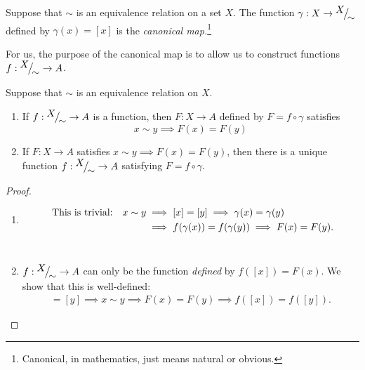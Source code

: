 \begin{defn}{}{}
	Suppose that $\sim$ is an equivalence relation on a set $X$. The function $\gamma:X\to {}^{\textstyle {X}}\!\big/_{\textstyle \!{\sim}}$ defined by $\gamma(x)=[x]$ is the \emph{canonical map.}\footnote{Canonical, in mathematics, just means natural or obvious.}
\end{defn}

For us, the purpose of the canonical map is to allow us to construct functions $f:{}^{\textstyle {X}}\!\big/_{\textstyle \!{\sim}}\to A$.

\begin{thm}{}{}
	Suppose that $\sim$ is an equivalence relation on $X$.
	\begin{enumerate}
  	\item If $f:{}^{\textstyle {X}}\!\big/_{\textstyle \!{\sim}}\to A$ is a function, then $F:X\to A$ defined by $F=f\circ\gamma$ satisfies
  	\[
  		x\sim y\implies F(x)=F(y)
  	\]
  	\item If $F:X\to A$ satisfies $x\sim y\implies F(x)=F(y)$, then there is a unique function $f:{}^{\textstyle {X}}\!\big/_{\textstyle \!{\sim}}\to A$ satisfying $F=f\circ\gamma$.
	\end{enumerate}
\end{thm}

\begin{proof}
\begin{enumerate}
  \item\begin{align*}
	\hspace{4.3pt}\text{This is trivial:}\quad x\sim y&\implies [x]=[y]\implies \gamma(x)=\gamma(y)\\
	&\implies f(\gamma(x))=f(\gamma(y))\implies F(x)=F(y).
	\end{align*}\
	\item $f:{}^{\textstyle {X}}\!\big/_{\textstyle \!{\sim}}\to A$ can only be the function \emph{defined} by $f([x])=F(x)$. We show that this is well-defined:
	\begin{gather*}
	[x]=[y]\implies x\sim y\implies F(x)=F(y)\implies f([x])=f([y]).\tag*{\qedhere}
	\end{gather*}
\end{enumerate}
\end{proof}

